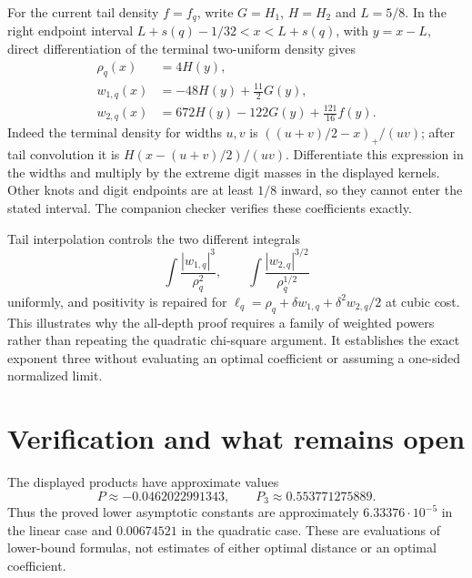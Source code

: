 \documentclass[11pt,letterpaper]{article}
\theoremstyle{remark}\newtheorem{remark}[theorem]{Remark}
\begin{document}
For the current tail density $f=f_q$, write $G=H_1$, $H=H_2$ and $L=5/8$. In the right endpoint interval $L+s(q)-1/32<x<L+s(q)$, with $y=x-L$, direct differentiation of the terminal two-uniform density gives
\begin{align*}
\rho_q(x)&=4H(y),\\
w_{1,q}(x)&=-48H(y)+\tfrac{11}{2}G(y),\\
w_{2,q}(x)&=672H(y)-122G(y)+\tfrac{121}{16}f(y).
\end{align*}
Indeed the terminal density for widths $u,v$ is $((u+v)/2-x)_+/(uv)$; after tail convolution it is $H(x-(u+v)/2)/(uv)$. Differentiate this expression in the widths and multiply by the extreme digit masses in the displayed kernels. Other knots and digit endpoints are at least $1/8$ inward, so they cannot enter the stated interval. The companion checker verifies these coefficients exactly.

Tail interpolation controls the two different integrals
\[
\int\frac{|w_{1,q}|^3}{\rho_q^2},\qquad
\int\frac{|w_{2,q}|^{3/2}}{\rho_q^{1/2}}
\]
uniformly, and positivity is repaired for
$\ell_q=\rho_q+\delta w_{1,q}+\delta^2w_{2,q}/2$ at cubic cost. This illustrates why the all-depth proof requires a family of weighted powers rather than repeating the quadratic chi-square argument. It establishes the exact exponent three without evaluating an optimal coefficient or assuming a one-sided normalized limit.

\section{Verification and what remains open}\label{sec:scope}

The displayed products have approximate values
\[
P\approx-0.0462022991343,\qquad P_3\approx0.553771275889.
\]
Thus the proved lower asymptotic constants are approximately $6.33376\cdot10^{-5}$ in the linear case and $0.00674521$ in the quadratic case. These are evaluations of lower-bound formulas, not estimates of either optimal distance or an optimal coefficient.
\end{document}
